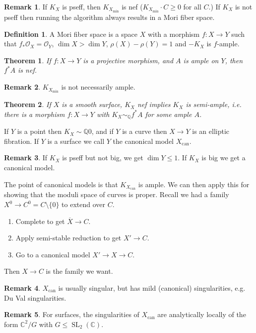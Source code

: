 \documentclass{article}
\newtheorem*{theorem}{Theorem}
\theoremstyle{definition}
\newtheorem*{definition}{Definition}
\newtheorem*{remark}{Remark}
\DeclareMathOperator{\SL}{SL}
\newcommand{\closure}[1]{\overline{#1}}
\newcommand{\can}{\mathrm{can}}
\newcommand{\minm}{\mathrm{min}}
\renewcommand{\O}{\mathcal{O}}
\newcommand{\Q}{\mathbb{Q}}
\newcommand{\C}{\mathbb{C}}
\begin{document}
\begin{remark}
    If $K_X$ is pseff, then $K_{X_\minm}$ is nef ($K_{X_\minm}\cdot C\ge0$ for all
    $C$.) If $K_X$ is not pseff then running the algorithm always results in a
    Mori fiber space.
\end{remark}

\begin{definition}
    A Mori fiber space is a space $X$ with a morphism $f:X\to Y$ such that
    $f_*\O_X=\O_Y$, $\dim X>\dim Y$, $\rho(X)-\rho(Y)=1$ and $-K_X$ is
    $f$-ample.
\end{definition}

\begin{theorem}
    If $f:X\to Y$ is a projective morphism, and $A$ is ample on $Y$, then
    $f^*A$ is nef.
\end{theorem}

\begin{remark}
    $K_{X_\minm}$ is not necessarily ample.
\end{remark}

\begin{theorem}
    If $X$ is a smooth surface, $K_X$ nef implies $K_X$ is semi-ample, i.e.
    there is a morphism $f:X\to Y$ with $K_X\sim_\Q f^*A$ for some ample $A$.
\end{theorem}

If $Y$ is a point then $K_X\sim\Q0$, and if $Y$ is a curve then $X\to Y$ is an
elliptic fibration. If $Y$ is a surface we call $Y$ the canonical model
$X_\can$.

\begin{remark}
    If $K_X$ is pseff but not big, we get $\dim Y\le1$. If $K_X$ is big we get a
    canonical model.
\end{remark}

The point of canonical models is that $K_{X_\can}$ is ample. We can then apply
this for showing that the moduli space of curves is proper. Recall we had a
family $X^0\to C^0=C\setminus\{0\}$ to extend over $C$.
\begin{enumerate}
    \item Complete to get $\closure X\to C$.
    \item Apply semi-stable reduction to get $X'\to C$.
    \item Go to a canonical model $X'\to X\to C$.
\end{enumerate}
Then $X\to C$ is the family we want.

\begin{remark}
    $X_\can$ is usually singular, but has mild (canonical) singularities, e.g.
    Du Val singularities.
\end{remark}

\begin{remark}
    For surfaces, the singularities of $X_\can$ are analytically locally of the
    form $\C^2/G$ with $G\le\SL_2(\C)$.
\end{remark}
\end{document}
